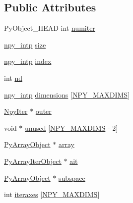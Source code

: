 \subsection*{Public Attributes}
\begin{DoxyCompactItemize}
\item 
Py\+Object\+\_\+\+H\+E\+AD int \hyperlink{structPyArrayMapIterObject_ac44284d2e5bc0f503fb24fcf5ac0aa89}{numiter}
\item 
\hyperlink{npy__common_8h_a2d6effc4d5ecb85675ebfcfaa102b483}{npy\+\_\+intp} \hyperlink{structPyArrayMapIterObject_af00e85d9e0daf4b4bed60c3014612398}{size}
\item 
\hyperlink{npy__common_8h_a2d6effc4d5ecb85675ebfcfaa102b483}{npy\+\_\+intp} \hyperlink{structPyArrayMapIterObject_a9b34a9ad621aee21d34a6c475fdd99ae}{index}
\item 
int \hyperlink{structPyArrayMapIterObject_ac99a51d4e8e938dadbdf72cb66fd810b}{nd}
\item 
\hyperlink{npy__common_8h_a2d6effc4d5ecb85675ebfcfaa102b483}{npy\+\_\+intp} \hyperlink{structPyArrayMapIterObject_ace5253686fb079760117e9be74e8e27a}{dimensions} \mbox{[}\hyperlink{ndarraytypes_8h_a737679ea9ee902bfa707c146051c17b5}{N\+P\+Y\+\_\+\+M\+A\+X\+D\+I\+MS}\mbox{]}
\item 
\hyperlink{ndarraytypes_8h_a866c6cf138a4574401b7741d4238c413}{Npy\+Iter} $\ast$ \hyperlink{structPyArrayMapIterObject_afe09c3ede254d7834c21b76267a4ed90}{outer}
\item 
void $\ast$ \hyperlink{structPyArrayMapIterObject_a02d72d04db522c5ae11df7802b3fe650}{unused} \mbox{[}\hyperlink{ndarraytypes_8h_a737679ea9ee902bfa707c146051c17b5}{N\+P\+Y\+\_\+\+M\+A\+X\+D\+I\+MS} -\/ 2\mbox{]}
\item 
\hyperlink{ndarraytypes_8h_af074aa0de75119b0769c7eff2bacf784}{Py\+Array\+Object} $\ast$ \hyperlink{structPyArrayMapIterObject_af3e3fff942f103b6520607b6a3eb2b13}{array}
\item 
\hyperlink{ndarraytypes_8h_ab11d6835958704afe8bb5a5f5df21aab}{Py\+Array\+Iter\+Object} $\ast$ \hyperlink{structPyArrayMapIterObject_a389d76786b735ac9b9729633beeea8b5}{ait}
\item 
\hyperlink{ndarraytypes_8h_af074aa0de75119b0769c7eff2bacf784}{Py\+Array\+Object} $\ast$ \hyperlink{structPyArrayMapIterObject_ad5077e1c7001845ceba268807744b562}{subspace}
\item 
int \hyperlink{structPyArrayMapIterObject_a8b1a27b59e85a52289650db62fc3c68b}{iteraxes} \mbox{[}\hyperlink{ndarraytypes_8h_a737679ea9ee902bfa707c146051c17b5}{N\+P\+Y\+\_\+\+M\+A\+X\+D\+I\+MS}\mbox{]}

\end{DoxyCompactItemize}
